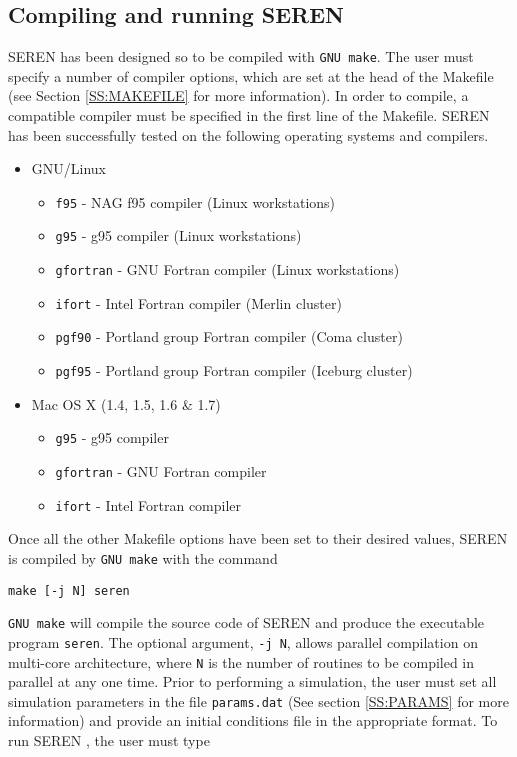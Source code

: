 \documentclass[a4paper]{article}
\newcommand{\NAME}{SEREN }
\newcommand{\var}[1]{\texttt{#1}}
\begin{document}
\subsection{Compiling and running \NAME}
\NAME has been designed so to be compiled with \var{GNU make}.  
The user must specify a number of compiler options, which are set at the 
head of the Makefile (see Section \ref{SS:MAKEFILE} for more information). 
In order to compile, a compatible compiler must be specified in the 
first line of the Makefile.  
\NAME has been successfully tested on the following operating systems 
and compilers.  
\begin{itemize}
\item GNU/Linux
\begin{itemize}
\item \var{f95}      - NAG f95 compiler (Linux workstations)
\item \var{g95}      - g95 compiler (Linux workstations)
\item \var{gfortran} - GNU Fortran compiler (Linux workstations)
\item \var{ifort}    - Intel Fortran compiler (Merlin cluster)
\item \var{pgf90}    - Portland group Fortran compiler (Coma cluster)
\item \var{pgf95}    - Portland group Fortran compiler (Iceburg cluster)
\end{itemize}
\item Mac OS X (1.4, 1.5, 1.6 \& 1.7)
\begin{itemize}
\item \var{g95}      - g95 compiler
\item \var{gfortran} - GNU Fortran compiler
\item \var{ifort}    - Intel Fortran compiler
\end{itemize}
\end{itemize}
Once all the other Makefile options have been set to their desired values, \NAME is compiled by \var{GNU make} with the command \newline

\var{make [-j N] seren} \newline

\noindent \var{GNU make} will compile the source code of \NAME and produce the executable program \var{seren}.  The optional argument, \var{-j N}, allows parallel compilation on multi-core architecture, where \var{N} is the number of routines to be compiled in parallel at any one time.  Prior to performing a simulation, the user must set all simulation parameters in the file \var{params.dat} (See section \ref{SS:PARAMS} for more information) and provide an initial conditions file in the appropriate format. To run \NAME, the user must type \newline 
\end{document}
